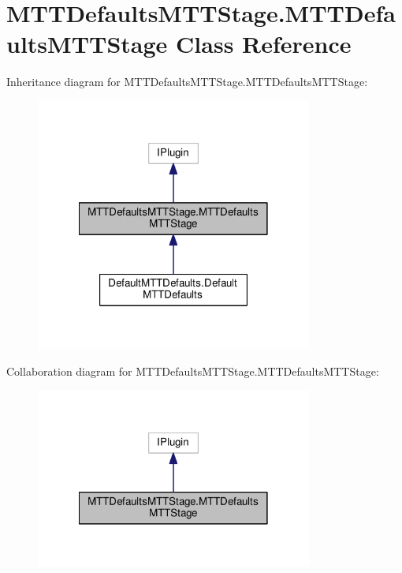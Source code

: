 \hypertarget{classMTTDefaultsMTTStage_1_1MTTDefaultsMTTStage}{\section{M\-T\-T\-Defaults\-M\-T\-T\-Stage.\-M\-T\-T\-Defaults\-M\-T\-T\-Stage Class Reference}
\label{classMTTDefaultsMTTStage_1_1MTTDefaultsMTTStage}
}


Inheritance diagram for M\-T\-T\-Defaults\-M\-T\-T\-Stage.\-M\-T\-T\-Defaults\-M\-T\-T\-Stage\-:
\nopagebreak
\begin{figure}[H]
\begin{center}
\leavevmode
\includegraphics[width=258pt]{classMTTDefaultsMTTStage_1_1MTTDefaultsMTTStage__inherit__graph}
\end{center}
\end{figure}


Collaboration diagram for M\-T\-T\-Defaults\-M\-T\-T\-Stage.\-M\-T\-T\-Defaults\-M\-T\-T\-Stage\-:
\nopagebreak
\begin{figure}[H]
\begin{center}
\leavevmode
\includegraphics[width=258pt]{classMTTDefaultsMTTStage_1_1MTTDefaultsMTTStage__coll__graph}
\end{center}
\end{figure}
